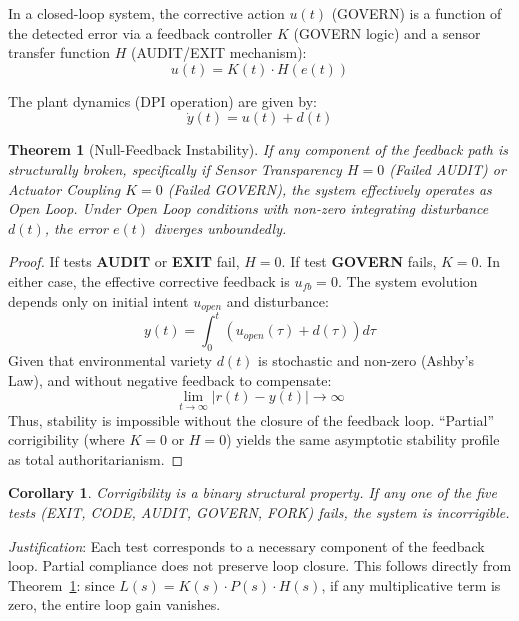 \documentclass{article}
\newtheorem{theorem}{Theorem}
\newtheorem{corollary}{Corollary}
\begin{document}
In a closed-loop system, the corrective action $u(t)$ (GOVERN) is a function of the detected error via a feedback controller $K$ (GOVERN logic) and a sensor transfer function $H$ (AUDIT/EXIT mechanism):
\begin{equation}
u(t) = K(t) \cdot H(e(t))
\end{equation}

The plant dynamics (DPI operation) are given by:
\begin{equation}
\dot{y}(t) = u(t) + d(t)
\end{equation}

\begin{theorem}[Null-Feedback Instability]
\label{thm:null-feedback}
If any component of the feedback path is structurally broken, specifically if Sensor Transparency $H=0$ (Failed AUDIT) or Actuator Coupling $K=0$ (Failed GOVERN), the system effectively operates as Open Loop. Under Open Loop conditions with non-zero integrating disturbance $d(t)$, the error $e(t)$ diverges unboundedly.
\end{theorem}

\begin{proof}
If tests \textbf{AUDIT} or \textbf{EXIT} fail, $H=0$.
If test \textbf{GOVERN} fails, $K=0$.
In either case, the effective corrective feedback is $u_{fb} = 0$.
The system evolution depends only on initial intent $u_{open}$ and disturbance:
\begin{equation}
y(t) = \int_0^t (u_{open}(\tau) + d(\tau)) d\tau
\end{equation}
Given that environmental variety $d(t)$ is stochastic and non-zero (Ashby's Law), and without negative feedback to compensate:
\begin{equation}
\lim_{t \to \infty} |r(t) - y(t)| \to \infty
\end{equation}
Thus, stability is impossible without the closure of the feedback loop. ``Partial'' corrigibility (where $K=0$ or $H=0$) yields the same asymptotic stability profile as total authoritarianism.
\end{proof}

\begin{corollary}
Corrigibility is a binary structural property. If any one of the five tests (EXIT, CODE, AUDIT, GOVERN, FORK) fails, the system is incorrigible.
\end{corollary}

\textit{Justification}: Each test corresponds to a necessary component of the feedback loop. Partial compliance does not preserve loop closure. This follows directly from Theorem~\ref{thm:null-feedback}: since $L(s) = K(s) \cdot P(s) \cdot H(s)$, if any multiplicative term is zero, the entire loop gain vanishes.
\end{document}

